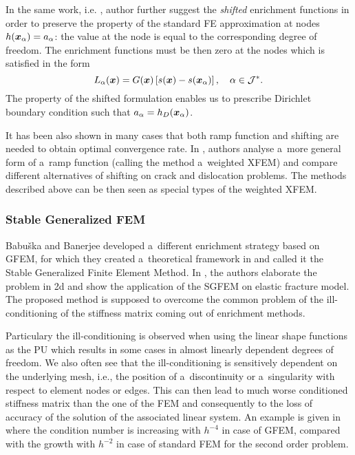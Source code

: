 In the same work, i.e. \cite{fries_corrected_2008}, author further suggest the \emph{shifted} enrichment functions in order 
to preserve the property of the standard 
FE approximation at nodes $h(\mathbf{\boldsymbol{x}}_\alpha)=a_\alpha$: the value at the node is equal to the corresponding degree
of freedom. The enrichment functions must be then zero at the nodes which is satisfied in the form
\begin{equation} \label{eqn:xfem_shift}
    L_{\alpha}(\mathbf{\boldsymbol{x}}) = G(\mathbf{\boldsymbol{x}}) \left[s(\mathbf{\boldsymbol{x}}) - s(\mathbf{\boldsymbol{x}}_\alpha)\right],
    \quad \alpha\in\mathcal{J}^*.
\end{equation} 
The property of the shifted formulation enables us to prescribe Dirichlet boundary condition such that
$a_\alpha = h_D(\mathbf{\boldsymbol{x}}_\alpha)$.

It has been also shown in many cases that both ramp function and shifting are needed to obtain optimal convergence rate.
In \cite{ventura_fast_2009}, authors analyse a~more general form of a~ramp function (calling the method a~weighted XFEM)
and compare different alternatives of shifting on crack and dislocation problems. The methods described above can be then seen
as special types of the weighted XFEM. 


\subsubsection{Stable Generalized FEM} \label{sec:stable_gfem}


Babuška and Banerjee developed a~different enrichment strategy based on GFEM,
for which they created a~theoretical framework in \cite{babuska_stable_2012} and
called it the Stable Generalized Finite Element Method.
In \cite{gupta_stable_2013}, the authors elaborate the problem in 2d and show the application of the SGFEM on elastic fracture model.
The proposed method is supposed to overcome the common problem of the ill-conditioning of the stiffness matrix coming out of enrichment methods.

Particulary the ill-conditioning is observed when using the linear shape functions as the PU which results in some cases in almost linearly dependent degrees of freedom.
We also often see that the ill-conditioning is sensitively dependent on the underlying mesh, i.e., the position of a~discontinuity or a~singularity with respect to 
element nodes or edges.
This can then lead to much worse conditioned stiffness matrix than the one of the FEM
and consequently to the loss of accuracy of the solution of the associated linear system.
An example is given in \cite{babuska_stable_2012} where the condition number is increasing with $h^{-4}$ in case of GFEM,
compared with the growth with $h^{-2}$ in case of standard FEM for the second order problem.

